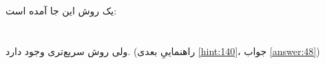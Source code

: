 \section{}
\paragraph{}\label{hint:134}
یک روش این جا آمده است:
\LTR\noindent
{}\\
\\
\\
\RTL
ولی روش سریع‌تری وجود دارد. (راهنماییِ بعدی \ref{hint:140}، جواب \ref{answer:48})